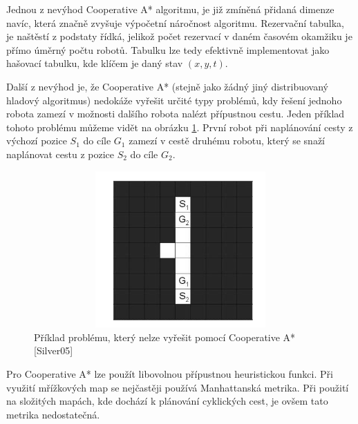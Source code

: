 Jednou z nevýhod Cooperative A* algoritmu, je již zmíněná přidaná dimenze navíc, která značně zvyšuje výpočetní náročnost algoritmu. Rezervační tabulka, je naštěstí z podstaty řídká, jelikož počet rezervací v daném časovém okamžiku je přímo úměrný počtu robotů. Tabulku lze tedy efektivně implementovat jako hašovací tabulku, kde klíčem je daný stav $\left(x,y,t\right)$.

Další z nevýhod je, že Cooperative A* (stejně jako žádný jiný distribuovaný hladový algoritmus) nedokáže vyřešit určité typy problémů, kdy řešení jednoho robota zamezí v možnosti dalšího robota nalézt přípustnou cestu. Jeden příklad tohoto problému můžeme vidět na obrázku \ref{obr:unsolvableCoopProblem}. První robot při naplánování cesty z výchozí pozice $S_1$ do cíle $G_1$ zamezí v cestě druhému robotu, který se snaží naplánovat cestu z pozice $S_2$ do cíle $G_2$.

\begin{figure}[htb]
	\begin{center}
		\includegraphics*[width=15cm,height=6cm,keepaspectratio]{obr/unsolvableCoopProblem}
	\end{center}
	\caption[caption]{Příklad problému, který nelze vyřešit pomocí Cooperative A* [Silver05]}
	\label{obr:unsolvableCoopProblem}
\end{figure}

Pro Cooperative A* lze použít libovolnou přípustnou heuristickou funkci. Při využití mřížkových map se nejčastěji používá Manhattanská metrika. Při použití na složitých mapách, kde dochází k plánování cyklických cest, je ovšem tato metrika nedostatečná.

